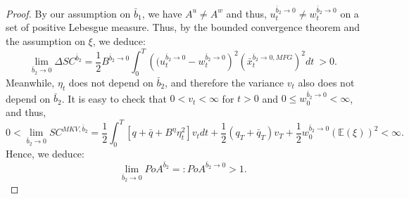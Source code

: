 \documentclass[11pt]{article}
\begin{document}
\begin{proof}
   	By our assumption on $\bar{b}_1$, we have $A^u \neq A^w$ and thus, $u^{\bar{b}_2 \to 0}_t\neq w^{\bar{b}_2 \to 0}_t$ on a set of positive Lebesgue measure. Thus, by the bounded convergence theorem and the assumption on $\xi$, we deduce:
	$$ \lim_{\bar{b}_2 \to 0} \Delta SC^{\bar{b}_2} = \frac{1}{2} B^{\bar{b}_2 \to 0} \int_0^T \left( (u_t^{\bar{b}_2 \to 0} - w_t^{\bar{b}_2 \to 0}\right)^2 \left (\bar{x}_t^{\bar{b}_2 \to 0,MFG} \right)^2 dt \  > 0. $$
	Meanwhile, $\eta_t$ does not depend on $\bar{b}_2$, and therefore the variance $v_t$ also does not depend on $\bar{b}_2$. It is easy to check that $0<v_t<\infty$ for $t>0$ and $0 \leq w^{\bar{b}_2 \to 0}_0 < \infty$, and thus,
	\begin{equation*}
	    0<\lim_{\bar{b}_2 \to 0}SC^{MKV,\bar{b}_2} = \frac{1}{2}\int_0^T \left[q+\bar{q} + B^{\eta} \eta_t^2 \right] v_t dt + \frac{1}{2}(q_T + \bar{q}_T) v_T + \frac{1}{2}w^{\bar{b}_2 \to 0}_0 (\mathbb{E}(\xi))^2<\infty.     
	\end{equation*}
	Hence, we deduce:
	$$ \lim_{\bar{b}_2 \to 0} PoA^{\bar{b}_2} =: PoA^{\bar{b}_2 \to 0} > 1. $$
	

\end{proof}
\end{document}
